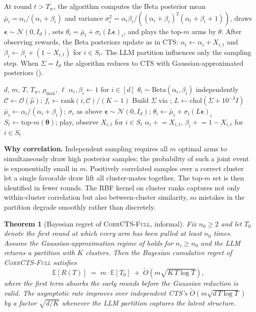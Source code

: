 \documentclass{article}
\theoremstyle{plain}
\newtheorem{theorem}{Theorem}[section]
\theoremstyle{definition}
\theoremstyle{remark}
\newcommand{\E}{\mathbb{E}}
\newcommand{\CorrFull}{\textsc{CorrCTS-Full}}
\begin{document}
At round $t > T_w$, the algorithm computes the Beta posterior mean $\bar\mu_i = \alpha_i/(\alpha_i + \beta_i)$ and variance $\sigma_i^2 = \alpha_i\beta_i / ((\alpha_i + \beta_i)^2(\alpha_i+\beta_i+1))$, draws $\boldsymbol\epsilon \sim \mathcal{N}(0, I_d)$, sets $\theta_i = \bar\mu_i + \sigma_i (L\boldsymbol\epsilon)_i$, and plays the top-$m$ arms by $\theta$.
After observing rewards, the Beta posteriors update as in CTS: $\alpha_i \leftarrow \alpha_i + X_{i,t}$ and $\beta_i \leftarrow \beta_i + (1 - X_{i,t})$ for $i \in S_t$.
The LLM partition influences only the sampling step.
When $\Sigma = I_d$ the algorithm reduces to CTS with Gaussian-approximated posteriors ().

\begin{algorithm}[t]
\caption{\CorrFull}
\label{alg:corrfull}
\begin{algorithmic}[1]
\REQUIRE $d$, $m$, $T$, $T_w$, $\rho_{\max}$, $\ell$
\STATE $\alpha_i, \beta_i \gets 1$ for $i \in [d]$
    \STATE $\theta_i \sim \mathrm{Beta}(\alpha_i, \beta_i)$ independently
  \ELSE
      \STATE $\mathcal{C} \gets \mathcal{O}(\hat\mu)$; $f_i \gets \mathrm{rank}(i, \mathcal{C})/(K-1)$
      \STATE Build $\Sigma$ via ; $L \gets \mathrm{chol}(\Sigma + 10^{-3}I)$
    \ENDIF
    \STATE $\bar\mu_i \gets \alpha_i/(\alpha_i+\beta_i)$; $\sigma_i$ as above
    \STATE $\boldsymbol\epsilon \sim \mathcal{N}(0, I_d)$; $\theta_i \gets \bar\mu_i + \sigma_i (L\boldsymbol\epsilon)_i$
  \ENDIF
  \STATE $S_t \gets \mathrm{top}\text{-}m(\boldsymbol\theta)$; play, observe $X_{i,t}$ for $i \in S_t$
  \STATE $\alpha_i \mathrel{+}= X_{i,t}$, $\beta_i \mathrel{+}= 1 - X_{i,t}$ for $i \in S_t$
\ENDFOR
\end{algorithmic}
\end{algorithm}

\textbf{Why correlation.}
Independent sampling requires all $m$ optimal arms to simultaneously draw high posterior samples; the probability of such a joint event is exponentially small in $m$.
Positively correlated samples over a correct cluster let a single favorable draw lift all cluster-mates together.
The top-$m$ set is then identified in fewer rounds.
The RBF kernel on cluster ranks captures not only within-cluster correlation but also between-cluster similarity, so mistakes in the partition degrade smoothly rather than discretely.

\begin{theorem}[Bayesian regret of \CorrFull, informal]\label{thm:bayes}
Fix $n_0 \geq 2$ and let $T_0$ denote the first round at which every arm has been pulled at least $n_0$ times.
Assume the Gaussian-approximation regime of  holds for $n_i \geq n_0$ and the LLM returns a partition with $K$ clusters.
Then the Bayesian cumulative regret of \CorrFull{} satisfies
\[
\E[R(T)] \;=\; m \cdot \E[T_0] \;+\; \tilde O\!\left(m \sqrt{K\, T \log T}\right),
\]
where the first term absorbs the early rounds before the Gaussian reduction is valid.
The asymptotic rate improves over independent CTS's $\tilde O(m\sqrt{d\, T \log T})$ by a factor $\sqrt{d/K}$ whenever the LLM partition captures the latent structure.
\end{theorem}
\end{document}
